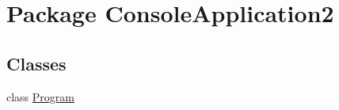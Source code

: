 \hypertarget{namespace_console_application2}{\section{Package Console\-Application2}
\label{namespace_console_application2}
}
\subsection*{Classes}
\begin{DoxyCompactItemize}
\item 
class \hyperlink{class_console_application2_1_1_program}{Program}
\end{DoxyCompactItemize}
